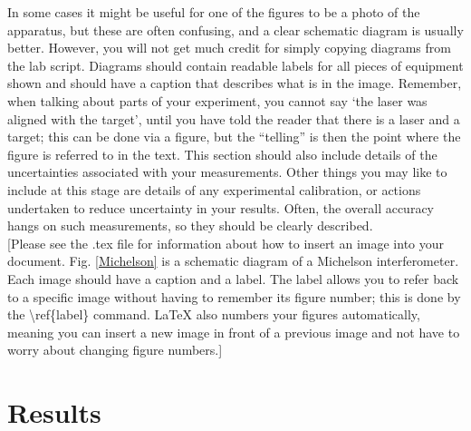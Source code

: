 \documentclass[11pt]{article} %
\begin{document}
 In some cases it might be useful for one of the figures to be a photo of the apparatus, but these are often confusing, and a clear schematic diagram is usually better. However, you will not get much credit for simply copying diagrams from the lab script. Diagrams should contain readable labels for all pieces of equipment shown and should have a caption that describes what is in the image. Remember, when talking about parts of your experiment, you cannot say `the laser was aligned with the target', 
%
%
until you have told the reader that there is a laser and a target; this can be done via a figure, but the “telling” is then the point where the figure is referred to in the text.  This section should also include details of the uncertainties associated with your measurements. Other things you may like to include at this stage are details of any experimental calibration, or actions undertaken to reduce uncertainty in your results. Often, the overall accuracy hangs on such measurements, so they should be clearly described. \\

{\color{blue} 
 [Please see the .tex file for information about how to insert an image into your document. Fig. \ref{Michelson} is a schematic diagram of a Michelson interferometer. Each image should have a caption and a label. The label allows you to refer back to a specific image without having to remember its figure number; this is done by the \textbackslash ref\{label\} command. LaTeX also numbers your figures automatically, meaning you can insert a new image in front of a previous image and not have to worry about changing figure numbers.]\\
}


\section{Results}
\end{document}

